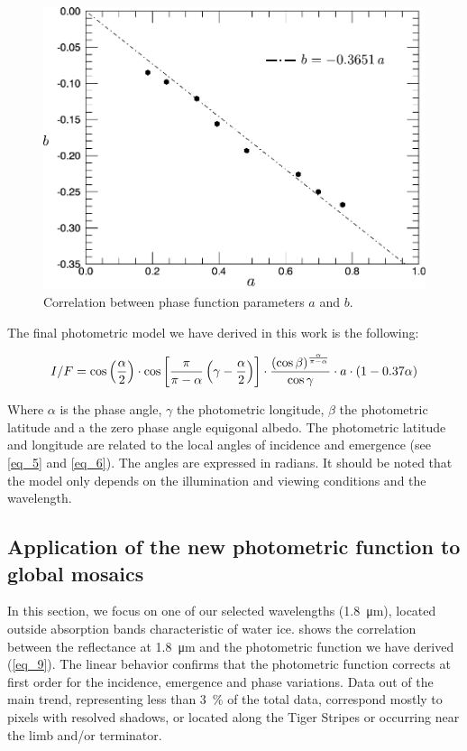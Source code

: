 \documentclass{arxiv-icarus}
\begin{document}
\begin{figure}[!ht]
    \includegraphics[width=.9\linewidth]{Fig_5}
    \caption{Correlation between phase function parameters $a$ and $b$.}
    \label{fig:fig_5}
\end{figure}

The final photometric model we have derived in this work is the following:

\begin{equation}\scriptsize\label{eq:eq_9}
    I/F
    =
    \cos\left( \frac{\alpha}{2} \right)
    \cdot
    \cos\left[
        \frac{\pi}{\pi - \alpha} \left( \gamma - \frac{\alpha}{2} \right)
    \right]
    \cdot
    \frac{\left( \cos\beta \right)^{ \frac{\alpha}{\pi - \alpha} }}{\cos\gamma}
    \cdot
    a \cdot \left( 1 - 0.37 \alpha \right)
\end{equation}

\vfill\null

Where $\alpha$ is the phase angle, $\gamma$ the photometric longitude, $\beta$ the photometric latitude and a the zero phase angle equigonal albedo. The photometric latitude and longitude are related to the local angles of incidence and emergence (see \eqref{eq_5} and \eqref{eq_6}). The angles are expressed in radians. It should be noted that the model only depends on the illumination and viewing conditions and the wavelength.


\subsection{Application of the new photometric function to global mosaics}

In this section, we focus on one of our selected wavelengths (\SI{1.8}{\um}), located outside absorption bands characteristic of water ice.  shows the correlation between the reflectance at \SI{1.8}{\um} and the photometric function we have derived (\eqref{eq_9}). The linear behavior confirms that the photometric function corrects at first order for the incidence, emergence and phase variations. Data out of the main trend, representing less than \SI{3}{\percent} of the total data, correspond mostly to pixels with resolved shadows, or located along the Tiger Stripes or occurring near the limb and/or terminator.
\end{document}
